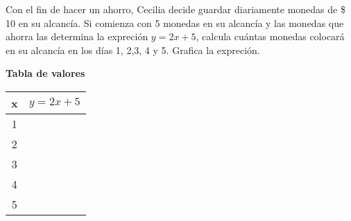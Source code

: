 
\question Con el fin de hacer un ahorro, Cecilia
          decide guardar diariamente monedas de \$ 10  en su alcancía. Si
          comienza con 5 monedas en su alcancía y las monedas que ahorra las
          determina la expreción $y = 2x + 5$, calcula cuántas monedas
          colocará en su alcancía en los días 1, 2,3, 4 y 5. Grafica la
          expreción.

\textbf{Tabla de valores}

\begin{multicols}{2}
\begin{center}
  \begin{tabular}{|c|c|}
     \hline
     \rowcolor[HTML]{C0C0C0}
         x & $y = 2x + 5$ \\
     \hline 1 &  \\
     \hline 2 &  \\
     \hline 3 &  \\
     \hline 4 &  \\
     \hline 5 &  \\
     \hline
  \end{tabular}
\end{center}

\end{multicols}
